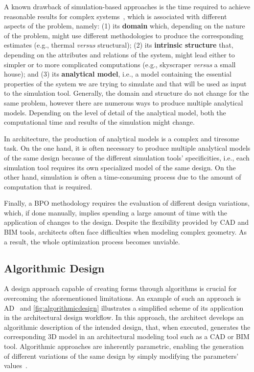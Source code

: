 	A known drawback of simulation-based approaches is the time required to achieve reasonable results for complex systems~\cite{Law1991}, which is associated with different aspects of the problem, namely: (1) its \textbf{domain} which, depending on the nature of the problem, might use different methodologies to produce the corresponding estimates (e.g., thermal \textit{versus} structural); (2) its \textbf{intrinsic structure} that, depending on the attributes and relations of the system, might lead either to simpler or to more complicated computations (e.g., skyscraper \textit{versus} a small house); and (3) its \textbf{analytical model}, i.e., a model containing the essential properties of the system we are trying to simulate and that will be used as input to the simulation tool. Generally, the domain and structure do not change for the same problem, however there are numerous ways to produce multiple analytical models. Depending on the level of detail of the analytical model, both the computational time and results of the simulation might change. 

	In architecture, the production of analytical models is a complex and tiresome task. On the one hand, it is often necessary to produce multiple analytical models of the same design because of the different simulation tools' specificities, i.e., each simulation tool requires its own specialized model of the same design. On the other hand, simulation is often a time-consuming process due to the amount of computation that is required.

	Finally, a \ac{BPO} methodology requires the evaluation of different design variations, which, if done manually, implies spending a large amount of time with the application of changes to the design. Despite the flexibility provided by \ac{CAD} and \ac{BIM} tools, architects often face difficulties when modeling complex geometry. As a result, the whole optimization process becomes unviable.
	
\subsection{Algorithmic Design}
\label{ssec:ad}
	A design approach capable of creating forms through algorithms is crucial for overcoming the aforementioned limitations. An example of such an approach is \ac{AD}~\cite{Branco2017AD} and \cref{fig:algorithmicdesign} illustrates a simplified scheme of its application in the architectural design workflow. In this approach, the architect develops an algorithmic description of the intended design, that, when executed, generates the corresponding 3D model in an architectural modeling tool such as a \ac{CAD} or \ac{BIM} tool. Algorithmic approaches are inherently parametric, enabling the generation of different variations of the same design by simply modifying the parameters' values~\cite{Leitao2014GD}. 
	
